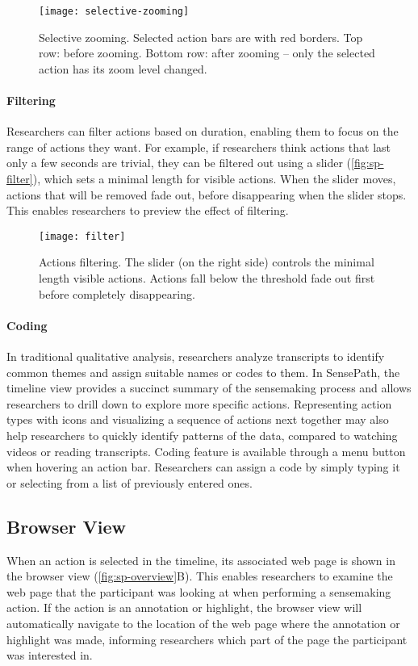 \begin{figure}[!htb]
\centering
\texttt{[image: selective-zooming]}
\caption{Selective zooming. Selected action bars are with red borders. Top row: before zooming. Bottom row: after zooming -- only the selected action has its zoom level changed.}
\label{fig:sp-selective-zooming}
\end{figure}

\paragraph{Filtering}
Researchers can filter actions based on duration, enabling them to focus on the range of actions they want. For example, if researchers think actions that last only a few seconds are trivial, they can be filtered out using a slider (\autoref{fig:sp-filter}), which sets a minimal length for visible actions. When the slider moves, actions that will be removed fade out, before disappearing when the slider stops. This enables researchers to preview the effect of filtering.

\begin{figure}[!htb]
\centering
\texttt{[image: filter]}
\caption{Actions filtering. The slider (on the right side) controls the minimal length visible actions. Actions fall below the threshold fade out first before completely disappearing.}
\label{fig:sp-filter}
\end{figure}

\paragraph{Coding}
In traditional qualitative analysis, researchers analyze transcripts to identify common themes and assign suitable names or codes to them. In SensePath, the timeline view provides a succinct summary of the sensemaking process and allows researchers to drill down to explore more specific actions. Representing action types with icons and visualizing a sequence of actions next together may also help researchers to quickly identify patterns of the data, compared to watching videos or reading transcripts. Coding feature is available through a menu button when hovering an action bar. Researchers can assign a code by simply typing it or selecting from a list of previously entered ones.

\subsection{Browser View}
\label{sub:webpage}
When an action is selected in the timeline, its associated web page is shown in the browser view (\autoref{fig:sp-overview}B). This enables researchers to examine the web page that the participant was looking at when performing a sensemaking action. If the action is an annotation or highlight, the browser view will automatically navigate to the location of the web page where the annotation or highlight was made, informing researchers which part of the page the participant was interested in.


